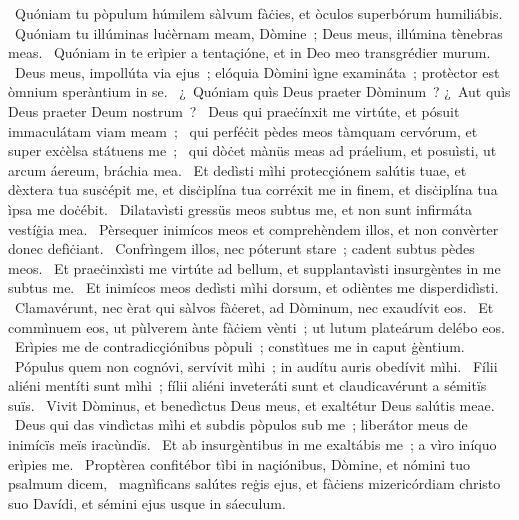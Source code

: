 ~Quóniam tu pòpulum húmilem sàlvum fàċies, et òculos superbórum humiliábis. 
~Quóniam tu illúminas luċèrnam meam, Dòmine~; Deus meus, illúmina tènebras meas. 
~Quóniam in te erìpier a tentaçióne, et in Deo meo transgrédier murum. 
~Deus meus, impollúta via ejus~; elóquia Dòmini ìgne examináta~; protèctor est òmnium speràntium in se. 
~¿~Quóniam quìs Deus praeter Dòminum~? ¿~Aut quìs Deus praeter Deum nostrum~? 
~Deus qui praeċínxit me virtúte, et pósuit immaculátam viam meam~; 
~qui perféċit pèdes meos tàmquam cervórum, et super exċèlsa státuens me~; 
~qui dòċet mànüs meas ad práelium, et posuìsti, ut arcum áereum, bráchia mea. 
~Et dedìsti mìhi protecçiónem salútis tuae, et dèxtera tua susċépit me, et disċiplína tua corréxit me in finem, et disċiplína tua ìpsa me doċébit. 
~Dilatavìsti gressüs meos subtus me, et non sunt infirmáta vestíġia mea. 
~Pèrsequer inimícos meos et comprehèndem illos, et non convèrter donec defìċiant. 
~Confrìngem illos, nec póterunt stare~; cadent subtus pèdes meos. 
~Et praeċinxìsti me virtúte ad bellum, et supplantavìsti insurgèntes in me subtus me. 
~Et inimícos meos dedìsti mìhi dorsum, et odièntes me disperdidìsti. 
~Clamavérunt, nec èrat qui sàlvos fàċeret, ad Dòminum, nec exaudívit eos. 
~Et commìnuem eos, ut pùlverem ànte fàċiem vènti~; ut lutum plateárum delébo eos. 
~Erìpies me de contradicçiónibus pòpuli~; constìtues me in caput ġèntium. 
~Pópulus quem non cognóvi, servívit mìhi~; in audítu auris obedívit mìhi. 
~Fílii aliéni mentíti sunt mìhi~; fílii aliéni inveteráti sunt et claudicavérunt a sémitïs suïs. 
~Vivit Dòminus, et benedìctus Deus meus, et exaltétur Deus salútis meae. 
~Deus qui das vindìctas mìhi et subdis pòpulos sub me~; liberátor meus de inimícïs meïs iracùndïs. 
~Et ab insurgèntibus in me exaltábis me~; a vìro iníquo erìpies me. 
~Proptèrea confitébor tìbi in naçiónibus, Dòmine, et nómini tuo psalmum dicem, 
~magnìficans salútes reġis ejus, et fàċiens mizericórdiam christo suo Davídi, et sémini ejus usque in sáeculum. 
